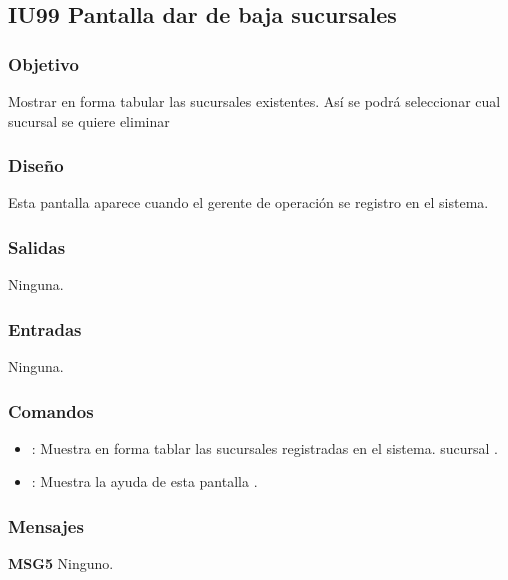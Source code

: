 \subsection{IU99 Pantalla dar de baja sucursales}

\subsubsection{Objetivo}
	Mostrar en forma tabular las sucursales existentes. Así se podrá seleccionar cual sucursal se quiere eliminar

\subsubsection{Diseño}
	Esta pantalla aparece cuando el gerente de operación se registro en el sistema.


\subsubsection{Salidas}

	Ninguna.

\subsubsection{Entradas}
	Ninguna.

\subsubsection{Comandos}
\begin{itemize}
	\item {}: Muestra en forma tablar las sucursales registradas en el sistema. sucursal .
	\item {}: Muestra la ayuda de esta pantalla .
\end{itemize}

\subsubsection{Mensajes}
	\begin{Citemize}
		\item {\bf MSG5} Ninguno.
	\end{Citemize}

